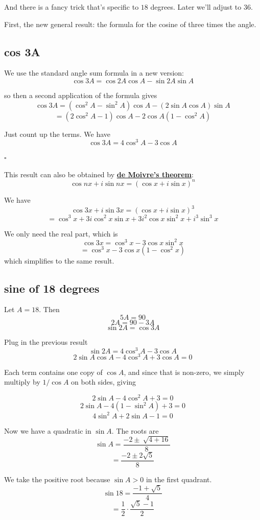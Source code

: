 \documentclass[11pt, oneside]{article}
\begin{document}
And there is a fancy trick that's specific to $18$ degrees.  Later we'll adjust to $36$.

First, the new general result:  the formula for the cosine of three times the angle.

\subsection*{cos 3A}

We use the standard angle sum formula in a new version:
\[ \cos 3A = \cos 2A \cos A - \sin 2A \sin A \]

so then a second application of the formula gives
\[ \cos 3A = (\cos^2 A - \sin^2 A) \cos A - (2 \sin A \cos A) \sin A \]
\[ = (2 \cos^2 A - 1) \cos A - 2 \cos A (1 - \cos^2A) \]

Just count up the terms.  We have
\[ \cos 3A = 4 \cos^3 A - 3 \cos A \]

$\square$

This result can also be obtained by \hyperref[sec:de_Moivre_theorem]{\textbf{de Moivre's theorem}}:
\[ \cos nx + i \sin nx = (\cos x + i \sin x)^n \]

We have
\[ \cos 3x + i \sin 3x = (\cos x + i \sin x)^3 \]
\[ = \cos^3 x + 3i \cos^2 x \sin x + 3i^2 \cos x \sin^2 x + i^3 \sin^3 x \]

We only need the real part, which is
\[ \cos 3x = \cos^3 x - 3 \cos x \sin^2 x \]
\[ = \cos^3 x - 3 \cos x (1 - \cos^2 x) \]
which simplifies to the same result.

\subsection*{sine of 18 degrees}

Let $A = 18$.  Then
\[ 5A = 90 \]
\[ 2A = 90 - 3A \]
\[ \sin 2A = \cos 3A \]

Plug in the previous result
\[ \sin 2A =  4 \cos^3 A - 3 \cos A \]
\[ 2 \sin A \cos A - 4 \cos^3 A + 3 \cos A = 0 \]

Each term contains one copy of $\cos A$, and since that is non-zero, we simply multiply by $1/\cos A$ on both sides, giving

\[ 2 \sin A - 4 \cos^2 A + 3 = 0 \]
\[ 2 \sin A - 4 (1 - \sin^2 A) + 3 = 0 \]
\[ 4 \sin^2A + 2 \sin A - 1 = 0 \]

Now we have a quadratic in $\sin A$.  The roots are
\[ \sin A = \frac{-2 \pm \ \sqrt{4 + 16}}{8} \]
\[ = \frac{-2 \pm 2 \sqrt{5}}{8} \]

We take the positive root because $\sin A > 0$ in the first quadrant.
\[ \sin 18 = \frac{-1 + \sqrt{5}}{4} \]
\[ = \frac{1}{2} \cdot \frac{\sqrt{5} - 1}{2} \]
\end{document}
